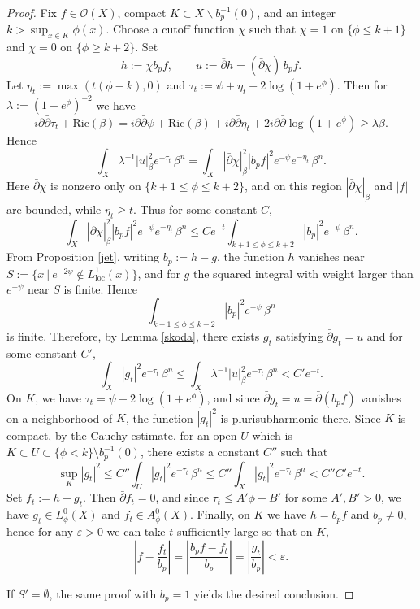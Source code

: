 \documentclass[a4paper, 12pt]{article}
\newcommand{\cO}{\mathcal{O}}
\newcommand{\Ric}{\mathrm{Ric}}
\newcommand{\loc}{\mathrm{loc}}
\newcommand{\idd}{i\partial\bar\partial}
\begin{document}
\begin{proof}
Fix $f \in \cO(X)$, compact $K\subset X\backslash b_p^{-1}(0)$, and an integer $k > \sup_{x\in K}\phi(x)$. Choose a cutoff function $\chi$ such that $\chi=1$ on $\{\phi \le k+1\}$ and $\chi=0$ on $\{\phi \ge k+2\}$. Set
\[
h := \chi b_p f, \qquad u := \bar\partial h = (\bar\partial \chi)\, b_p f.
\]
Let $\eta_t := \max(t(\phi-k),0)$ and $\tau_t := \psi + \eta_t + 2\log(1+e^\phi)$. Then for $\lambda := (1+e^\phi)^{-2}$ we have
\[
\idd\tau_t + \Ric(\beta)
= \idd\psi + \Ric(\beta) + \idd\eta_t + 2\idd\log(1+e^\phi)
\ge \lambda \beta .
\]
Hence
\[
\int_X \lambda^{-1}|u|_\beta^2 e^{-\tau_t}\,\beta^n
= \int_X |\bar\partial\chi|_\beta^2 |b_p f|^2 e^{-\psi} e^{-\eta_t}\,\beta^n .
\]
Here $\bar\partial\chi$ is nonzero only on $\{k+1\le \phi \le k+2\}$, and on this region $|\bar\partial\chi|_\beta$ and $|f|$ are bounded, while $\eta_t\ge t$. Thus for some constant $C$,
\[
\int_X |\bar\partial\chi|_\beta^2 |b_p f|^2 e^{-\psi} e^{-\eta_t}\,\beta^n\le C e^{-t} \int_{k+1\le \phi \le k+2} |b_p|^2 e^{-\psi}\,\beta^n .
\]
From Proposition \ref{jet}, writing $b_p:=h-g$, the function $h$ vanishes near $S:=\{x~|~e^{-2\psi}\notin L^1_\loc(x)\}$, and for $g$ the squared integral with weight larger than $e^{-\psi}$ near $S$ is finite. Hence
\[
\int_{k+1\le \phi \le k+2} |b_p|^2 e^{-\psi}\,\beta^n
\]
is finite. Therefore, by Lemma \ref{skoda}, there exists $g_t$ satisfying $\bar\partial g_t=u$ and for some constant $C'$,
\[
\int_X |g_t|^2 e^{-\tau_t}\,\beta^n \le \int_X \lambda^{-1}|u|_\beta^2 e^{-\tau_t}\,\beta^n < C' e^{-t}.
\]
On $K$, we have $\tau_t=\psi+2\log(1+e^\phi)$, and since $\bar\partial g_t=u=\bar\partial (b_p f)$ vanishes on a neighborhood of $K$, the function $|g_t|^2$ is plurisubharmonic there. Since $K$ is compact, by the Cauchy estimate, for an open $U$ which is $K\subset \overline U\subset \{\phi < k\}\setminus b_p^{-1}(0)$, there exists a constant $C''$ such that
\[
\sup_K |g_t|^2
\le C'' \int_U |g_t|^2 e^{-\tau_t}\,\beta^n
\le C'' \int_X |g_t|^2 e^{-\tau_t}\,\beta^n
< C''C' e^{-t}.
\]
Set $f_t:=h-g_t$. Then $\bar\partial f_t=0$, and since $\tau_t \le A'\phi+B'$ for some $A',B'>0$, we have $g_t\in L_\phi^0(X)$ and $f_t\in A_\phi^0(X)$. Finally, on $K$ we have $h=b_p f$ and $b_p\ne 0$, hence for any $\varepsilon>0$ we can take $t$ sufficiently large so that on $K$,
\[
\left| f-\frac{f_t}{b_p}\right|
= \left|\frac{b_p f-f_t}{b_p}\right|
= \left|\frac{g_t}{b_p}\right|
<\varepsilon .
\]

If $S'=\emptyset$, the same proof with $b_p=1$ yields the desired conclusion.
\end{proof}
\end{document}
